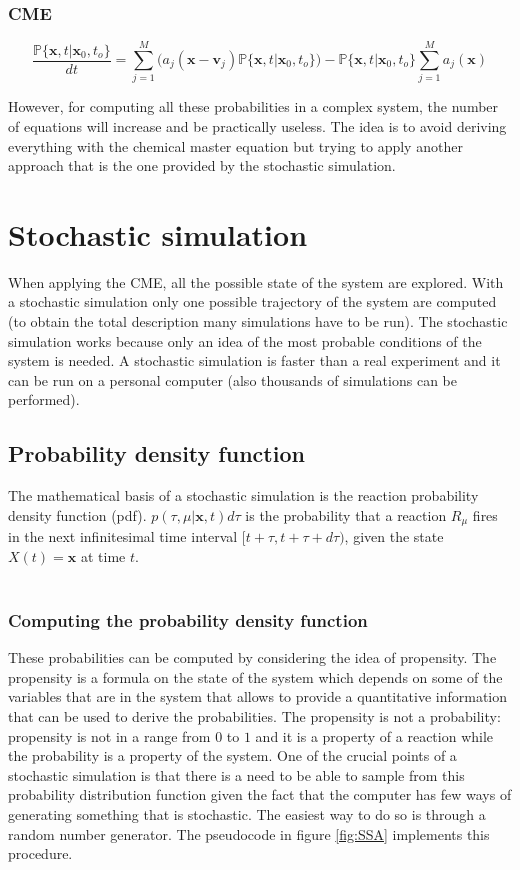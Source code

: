     \subsubsection{CME}

    $$\frac{\mathbb{P}\{\mathbf{x},t|\mathbf{x}_0,t_o\}}{dt}= \sum_{j=1}^{M}(a_j(\mathbf{x}-\mathbf{v}_j)\mathbb{P}\{\mathbf{x},t|\mathbf{x}_0,t_o\})- \mathbb{P}\{\mathbf{x},t|\mathbf{x}_0,t_o\}\sum^M_{j=1}a_j(\mathbf{x})$$

    However, for computing all these probabilities in a complex system, the number of equations will increase and be practically useless.
    The idea is to avoid deriving everything with the chemical master equation but trying to apply another approach that is the one provided by the stochastic simulation.

\section{Stochastic simulation}
When applying the CME, all the possible state of the system are explored.
With a stochastic simulation only one possible trajectory of the system are computed (to obtain the total description many simulations have to be run).
The stochastic simulation works because only an idea of the most probable conditions of the system is needed.
A stochastic simulation is faster than a real experiment and it can be run on a personal computer (also thousands of simulations can be performed).

  \subsection{Probability density function}
  The mathematical basis of a stochastic simulation is the reaction probability density function (pdf).
  $p(\tau, \mu |\mathbf{x}, t)d\tau$ is the probability that a reaction $R_\mu$ fires in the next infinitesimal time interval $[t+\tau,t+\tau+d\tau)$, given the state $X(t) = \mathbf{x}$ at time $t$.
  \\
  \\
  \noindent

    \subsubsection{Computing the probability density function}
    These probabilities can be computed by considering the idea of propensity.
    The propensity is a formula on the state of the system which depends on some of the variables that are in the system that allows to provide a quantitative information that can be used to derive the probabilities.
    The propensity is not a probability: propensity is not in a range from $0$ to $1$ and it is a property of a reaction while the probability is a property of the system.
    One of the crucial points of a stochastic simulation is that there is a need to be able to sample from this probability distribution  function given the fact that the computer has few ways of generating something that is stochastic.
    The easiest way to do so is through a random number generator.
    The pseudocode in figure \ref{fig:SSA} implements this procedure.

